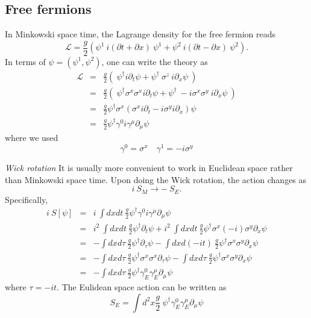 \documentclass[submission, PhysLectNotes]{SciPost}
\begin{document}
\subsection{Free fermions}
In Minkowski space time, the Lagrange density for the free fermion reads
\begin{equation}
    \mathcal{L} = \frac{g}{2}\left(\psi^1\ i(\partial t + \partial x)\ \psi^1 + \psi^2\ i(\partial t - \partial x)\ \psi^2 \right).
\end{equation}
In terms of $\psi = (\psi^1,\psi^2)$, one can write the theory as
\begin{eqnarray}
    \mathcal{L} &=& \frac{g}{2} \left ( \ \psi^\dagger i\partial_t \psi + \psi^\dagger \ \sigma^z \ i\partial_x \psi \ \right) \nonumber \\
    &=& \frac{g}{2} \left ( \ \psi^\dagger \sigma^x\sigma^x i\partial_t \psi + \psi^\dagger \ -i\sigma^x\sigma^y \ i\partial_x \psi \ \right) \nonumber\\
    &=& \frac{g}{2} \psi^\dagger \sigma^x \left(\sigma^x i \partial_t - i\sigma^y i\partial_x \right) \psi \nonumber \\
    &=& \frac{g}{2} \psi^\dagger \gamma^0 i\gamma^\mu \partial_\mu \psi
\end{eqnarray}
where we used
\begin{equation}
    \gamma^0 = \sigma^x \quad \gamma^1 = -i\sigma^y
\end{equation}

{\it Wick rotation}
It is usually more convenient to work in Euclidean space rather than Minkowski space time. Upon doing the Wick rotation, the action changes as
\begin{equation}
    i\ S_M \rightarrow -\ S_E.
\end{equation}
Specifically,
\begin{eqnarray}
    i\ S[\psi] &=& i\ \int dxdt \ \frac{g}{2} \psi^\dagger \gamma^0 i\gamma^\mu \partial_\mu \psi \nonumber \\
    &=& i^2 \ \int dxdt \ \frac{g}{2} \psi^\dagger \partial_t \psi + i^2 \ \int dxdt \ \frac{g}{2} \psi^\dagger \sigma^x (-i) \sigma^y \partial_x \psi \nonumber \\
    &=& -\int dxd\tau \ \frac{g}{2} \psi^\dagger \partial_\tau \psi - \int dxd(-i t) \ \frac{g}{2} \psi^\dagger \sigma^x \sigma^y \partial_x \psi \nonumber \\
    &=&  -\int dxd\tau \ \frac{g}{2} \psi^\dagger \sigma^x\sigma^x\partial_\tau \psi - \int dxd\tau \ \frac{g}{2} \psi^\dagger \sigma^x \sigma^y \partial_x \psi \nonumber \\
    &=&  -\int dxd\tau \ \frac{g}{2} \psi^\dagger \gamma^0_E\gamma^\mu_E\partial_\mu \psi
\end{eqnarray}
where $\tau = -it$. The Eulidean space action can be written as
\begin{equation}
    S_E = \int d^2x \frac{g}{2} \ \psi^\dagger \gamma^0_E\gamma^\mu_E\partial_\mu \psi
\end{equation}
\end{document}
